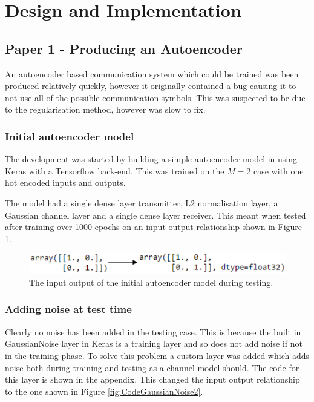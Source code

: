 \documentclass[12pt,onecolumn,letterpaper]{article}
\begin{document}
\FloatBarrier
\section{Design and Implementation}

\subsection{Paper 1 - Producing an Autoencoder}

An autoencoder based communication system which could be trained was been produced relatively quickly, however it originally contained a bug causing it to not use all of the possible communication symbols. This was suspected to be due to the regularisation method, however was slow to fix.

\subsubsection{Initial autoencoder model}

The development was started by building a simple autoencoder model in using Keras with a Tensorflow back-end. This was trained on the $M=2$ case with one hot encoded inputs and outputs. 

The model had a single dense layer transmitter, L2 normalisation layer, a Gaussian channel layer and a single dense layer receiver. This meant when tested after training over 1000 epochs on an input output relationship shown in Figure \ref{fig:CodeInitialOutput}.

\begin{figure}[t]
\begin{center}
   \includegraphics[width=0.8\linewidth]{figures/initial_ae_output.png}
\end{center}
   \caption{The input output of the initial autoencoder model during testing. }
\label{fig:CodeInitialOutput}
\end{figure}

\subsubsection{Adding noise at test time}

Clearly no noise has been added in the testing case. This is because the built in GaussianNoise layer in Keras is a training layer and so does not add noise if not in the training phase. To solve this problem a custom layer was added which adds noise both during training and testing as a channel model should. The code for this layer is shown in the appendix. This changed the input output relationship to the one shown in Figure \ref{fig:CodeGaussianNoise2}.
\end{document}
